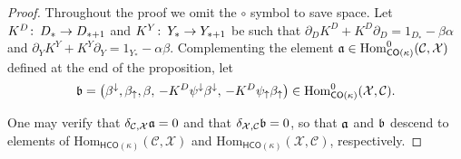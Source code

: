 \documentclass[11pt]{amsart}
\theoremstyle{definition}
\theoremstyle{remark}
\numberwithin{equation}{section}
\def\co{\colon\thinspace}
\begin{document}
\begin{proof}
	Throughout the proof we omit the $\circ$ symbol to save space.  Let $K^D\co D_*\to D_{*+1}$ and $K^Y\co Y_*\to Y_{*+1}$ be such that $\partial_DK^D+K^D\partial_D=1_{D_*}-\beta\alpha$ and $\partial_YK^Y+K^Y\partial_Y=1_{Y_*}-\alpha\beta$.  Complementing the element $\frak{a}\in \mathrm{Hom}^{0}_{\mathsf{CO}(\kappa)}(\mathcal{C},\mathcal{X})$ defined at the end of the proposition, let \[ 	\frak{b} = \left(\beta^{\downarrow},\beta_{\uparrow},\beta,\,-K^D\psi^{\downarrow}\beta^{\downarrow},\,-K^D\psi_{\uparrow}\beta_{\uparrow}\right)\in \mathrm{Hom}_{\mathsf{CO}(\kappa)}^0(\mathcal{X},\mathcal{C}).\] %




	
	One may verify that $\delta_{\mathcal{C},\mathcal{X}}\frak{a}=0$ and that $\delta_{\mathcal{X},\mathcal{C}}\frak{b}=0$, so that $\frak{a}$ and $\frak{b}$ descend to elements of  $\mathrm{Hom}_{\mathsf{HCO}(\kappa)}(\mathcal{C},\mathcal{X})$ and $\mathrm{Hom}_{\mathsf{HCO}(\kappa)}(\mathcal{X},\mathcal{C})$, respectively.  %
			

\end{proof}
\end{document}
